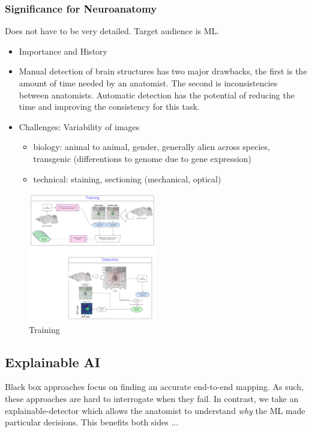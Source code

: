 \documentclass[runningheads]{llncs}
\begin{document}
\subsubsection {Significance for Neuroanatomy}
Does not have to be very detailed. Target audience is ML.
\begin{itemize}
\item Importance and History
\item Manual detection of brain structures has two major drawbacks, the first is the amount of time needed by an anatomist. The second is inconsistencies between anatomists. Automatic detection has the potential of reducing the time and improving the consistency for this task.
\item Challenges: Variability of images
    \begin{itemize}
        \item biology: animal to animal, gender, generally alien across species, transgenic (differentions to genome due to gene expression)
        \item technical: staining, sectioning (mechanical, optical)
    \end{itemize}
  \end{itemize}

\begin{figure}
\centering
\includegraphics[width=0.5\textwidth]{figures/detection.pdf}
\caption{Training \label{fig:train}}
\end{figure}

\subsection{Explainable AI}

Black box approaches focus on finding an accurate end-to-end mapping. As such, these approaches are hard to interrogate when they fail. In contrast, we take an explainable-detector which allows the anatomist to understand {\em why} the ML made particular decisions. This benefits both sides ...
\end{document}
